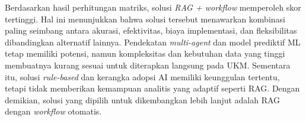 Berdasarkan hasil perhitungan matriks, solusi \textit{RAG + workflow} memperoleh skor tertinggi. Hal ini menunjukkan bahwa solusi tersebut menawarkan kombinasi paling seimbang antara akurasi, efektivitas, biaya implementasi, dan fleksibilitas dibandingkan alternatif lainnya. 
Pendekatan \textit{multi-agent} dan model prediktif ML tetap memiliki potensi, namun kompleksitas dan kebutuhan data yang tinggi membuatnya kurang sesuai untuk diterapkan langsung pada UKM. Sementara itu, solusi \textit{rule-based} dan kerangka adopsi AI memiliki keunggulan tertentu, tetapi tidak memberikan kemampuan analitis yang adaptif seperti RAG. Dengan demikian, solusi yang dipilih untuk dikembangkan lebih lanjut adalah RAG dengan \textit{workflow} otomatis.